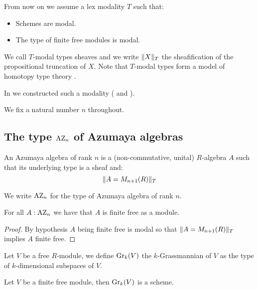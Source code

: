 From now on we assume a lex modality $T$ such that:
\begin{itemize}
\item Schemes are modal.
\item The type of finite free modules is modal.
\end{itemize}
We call $T$-modal types sheaves and we write $\lVert X \rVert_T$ the sheafification of the propositional truncation of $X$. Note that $T$-modal types form a model of homotopy type theory \cite{modalities,Quirin16}.

In  we constructed such a modality ( and ).

We fix a natural number $n$ throughout.


\subsection{The type $\mathrm{AZ}_n$ of Azumaya algebras}

\begin{definition}
An Azumaya algebra of rank $n$ is a (non-commutative, unital) $R$-algebra $A$ such that its underlying type is a sheaf and:
\[\lVert A=M_{n+1}(R) \rVert_T\]
\end{definition}

We write $\mathrm{AZ}_n$ for the type of Azumaya algebra of rank $n$.

\begin{lemma}\label{azumayas-are-finite-free}
For all $A:\mathrm{AZ}_n$ we have that $A$ is finite free as a module.
\end{lemma}

\begin{proof}
By hypothesis $A$ being finite free is modal so that $\lVert A=M_{n+1}(R) \rVert_T$ implies $A$ finite free.
\end{proof}

\begin{definition}
Let $V$ be a free $R$-module, we define $\mathrm{Gr}_k(V)$ the $k$-Grassmannian of $V$ as the type of $k$-dimensional subspaces of $V$.
\end{definition}

\begin{lemma}\label{grassmanians-are-schemes}
Let $V$ be a finite free module, then $\mathrm{Gr}_k(V)$ is a scheme.
\end{lemma}

